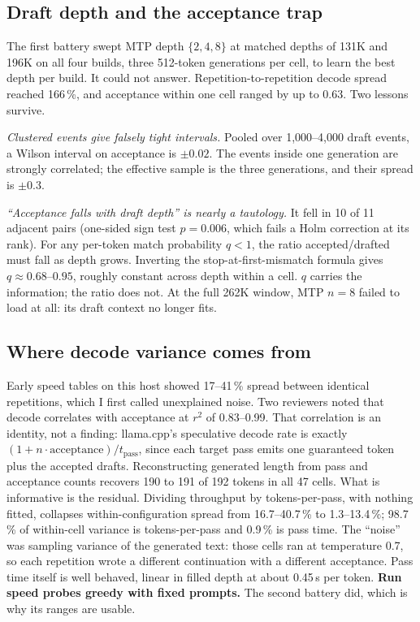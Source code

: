 \subsection{Draft depth and the acceptance trap}
The first battery swept MTP depth $\{2,4,8\}$ at matched depths of 131K and 196K on all four builds,
three 512-token generations per cell, to learn the best depth per build. It could not answer.
Repetition-to-repetition decode spread reached 166\,\%, and acceptance within one cell ranged by up to
0.63. Two lessons survive.

\emph{Clustered events give falsely tight intervals.} Pooled over 1{,}000--4{,}000 draft events, a
Wilson interval on acceptance is $\pm0.02$. The events inside one generation are strongly correlated;
the effective sample is the three generations, and their spread is $\pm0.3$.

\emph{``Acceptance falls with draft depth'' is nearly a tautology.} It fell in 10 of 11 adjacent pairs
(one-sided sign test $p=0.006$, which fails a Holm correction at its rank). For any per-token match
probability $q<1$, the ratio accepted/drafted must fall as depth grows. Inverting the
stop-at-first-mismatch formula gives $q\approx0.68$--$0.95$, roughly constant across depth within a
cell. $q$ carries the information; the ratio does not. At the full 262K window, MTP $n{=}8$ failed to
load at all: its draft context no longer fits.

\subsection{Where decode variance comes from}\label{sec:variance}
Early speed tables on this host showed 17--41\,\% spread between identical repetitions, which I first
called unexplained noise. Two reviewers noted that decode correlates with acceptance at $r^2$ of
0.83--0.99. That correlation is an identity, not a finding: llama.cpp's speculative decode rate is
exactly $(1+n\cdot\text{acceptance})/t_\text{pass}$, since each target pass emits one guaranteed token
plus the accepted drafts. Reconstructing generated length from pass and acceptance counts recovers 190
to 191 of 192 tokens in all 47 cells. What is informative is the residual. Dividing throughput by
tokens-per-pass, with nothing fitted, collapses within-configuration spread from 16.7--40.7\,\% to
1.3--13.4\,\%; 98.7\,\% of within-cell variance is tokens-per-pass and 0.9\,\% is pass time. The
``noise'' was sampling variance of the generated text: those cells ran at temperature 0.7, so each
repetition wrote a different continuation with a different acceptance. Pass time itself is well
behaved, linear in filled depth at about 0.45\,\textmu s per token. \textbf{Run speed probes greedy
with fixed prompts.} The second battery did, which is why its ranges are usable.
